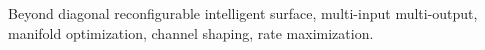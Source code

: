 \documentclass[journal]{IEEEtran}
\begin{document}
\begin{abstract}
\end{abstract}

\begin{IEEEkeywords}
	Beyond diagonal reconfigurable intelligent surface, multi-input multi-output, manifold optimization, channel shaping, rate maximization.
\end{IEEEkeywords}

\glsresetall
\end{document}
